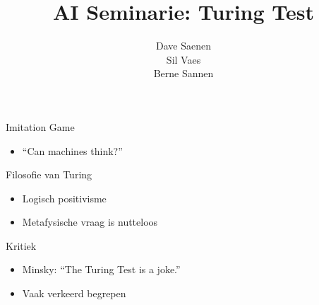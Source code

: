 \documentclass{beamer}
\title{AI Seminarie: Turing Test}
\date{}
\author{Dave Saenen \\ Sil Vaes \\ Berne Sannen}
\institute{UHasselt}
\begin{document}
  \maketitle
  \begin{frame}{Imitation Game}
    \begin{itemize}
    \item ``Can machines think?''
    \end{itemize}
  \end{frame}

  \begin{frame}{Filosofie van Turing}
    \begin{itemize}
    \item Logisch positivisme
    \item Metafysische vraag is nutteloos
    \end{itemize}
  \end{frame}

  \begin{frame}{Kritiek}
    \begin{itemize}
    \item Minsky: ``The Turing Test is a joke.''
    \item Vaak verkeerd begrepen
    \end{itemize}
  \end{frame}
  
\end{document}
